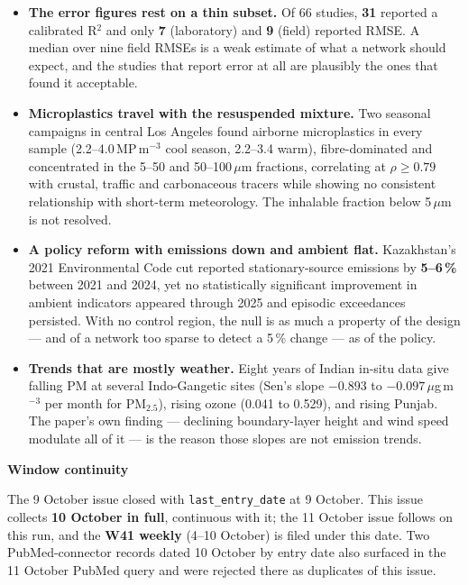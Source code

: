 \documentclass[10pt]{article}
\begin{document}
\footnotesize
\begin{itemize}

\item \textbf{The error figures rest on a thin subset.} Of 66 studies, \textbf{31} reported a calibrated
R$^2$ and only \textbf{7} (laboratory) and \textbf{9} (field) reported RMSE. A median over nine field
RMSEs is a weak estimate of what a network should expect, and the studies that report error at all are
plausibly the ones that found it acceptable.

\item \textbf{Microplastics travel with the resuspended mixture.} Two seasonal campaigns in central Los
Angeles found airborne microplastics in every sample (2.2--4.0\,MP\,m$^{-3}$ cool season,
2.2--3.4 warm), fibre-dominated and concentrated in the 5--50 and 50--100\,$\mu$m fractions, correlating
at $\rho \ge 0.79$ with crustal, traffic and carbonaceous tracers while showing no consistent relationship
with short-term meteorology. The inhalable fraction below 5\,$\mu$m is not resolved.

\item \textbf{A policy reform with emissions down and ambient flat.} Kazakhstan's 2021 Environmental Code cut
reported stationary-source emissions by \textbf{5--6\,\%} between 2021 and 2024, yet no statistically
significant improvement in ambient indicators appeared through 2025 and episodic exceedances persisted.
With no control region, the null is as much a property of the design --- and of a network too sparse to
detect a 5\,\% change --- as of the policy.

\item \textbf{Trends that are mostly weather.} Eight years of Indian in-situ data give falling PM at several
Indo-Gangetic sites (Sen's slope $-0.893$ to $-0.097\,\mu$g\,m$^{-3}$ per month for PM$_{2.5}$), rising
ozone (0.041 to 0.529), and rising Punjab. The paper's own finding --- declining boundary-layer height and
wind speed modulate all of it --- is the reason those slopes are not emission trends.

\end{itemize}

\vspace{2mm}

\begin{keybox}
{\sffamily\bfseries\footnotesize\color{Deep}Window continuity}\\[1.2mm]
{\fontsize{7.2}{8.8}\selectfont
The 9 October issue closed with \texttt{last\_entry\_date} at 9 October. This issue collects
\textbf{10 October in full}, continuous with it; the 11 October issue follows on this run, and the
\textbf{W41 weekly} (4--10 October) is filed under this date. Two PubMed-connector records dated 10 October
by entry date also surfaced in the 11 October PubMed query and were rejected there as duplicates of this
issue.\par}
\end{keybox}
\end{document}
